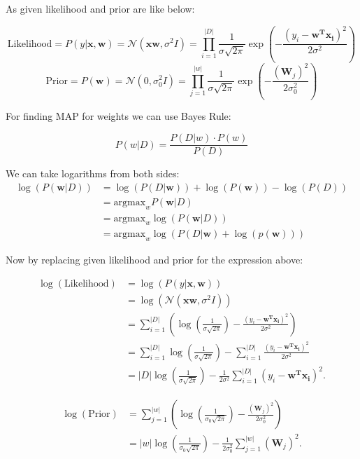 \documentclass{article}
\begin{document}
As given likelihood and prior are like below:

\[
\text{Likelihood} = P(y | \mathbf{x, w}) = \mathcal{N}(\mathbf{xw}, \sigma^2I) = \prod_{i=1}^{|D|} \frac{1}{\sigma \sqrt{2\pi}} \exp\left(- \frac{(y_i - \mathbf{w^T x_i})^2}{2\sigma^2}\right)
\]
\[
\text{Prior} = P(\mathbf{w}) = \mathcal{N}(0, \sigma_0^2I) = \prod_{j=1}^{|w|} \frac{1}{\sigma \sqrt{2\pi}} \exp\left(- \frac{(\mathbf{W}_j)^2}{2\sigma_0^2}\right)
\]

For finding MAP for weights we can use Bayes Rule:

\[
P(w | D) = \frac{P(D | w) \cdot P(w)}{P(D)}
\]

We can take logarithms from both sides:
\begin{align*}
\log(P(\mathbf{w} | D)) &= \log(P(D | \mathbf{w})) + \log(P(\mathbf{w})) - \log(P(D)) \\
&= \text{{argmax}}_w P(\mathbf{w} | D) \\
&= \text{{argmax}}_w \log(P(\mathbf{w} | D)) \\
&= \text{{argmax}}_w \log(P(D | \mathbf{w}) + \log(p(\mathbf{w})))
\end{align*}

Now by replacing given likelihood and prior for the expression above:

\[
\begin{aligned}
\log(\text{Likelihood}) &= \log(P(y | \mathbf{x, w})) \\
&= \log(\mathcal{N}(\mathbf{xw}, \sigma^2I)) \\
&= \sum_{i=1}^{|D|} \left(\log\left(\frac{1}{\sigma \sqrt{2\pi}}\right) - \frac{(y_i - \mathbf{w^T x_i})^2}{2\sigma^2}\right) \\
&= \sum_{i=1}^{|D|} \log\left(\frac{1}{\sigma \sqrt{2\pi}}\right) - \sum_{i=1}^{|D|}\frac{(y_i - \mathbf{w^T x_i})^2}{2\sigma^2} \\
&= |D| \log\left(\frac{1}{\sigma \sqrt{2\pi}}\right) - \frac{1}{2\sigma^2} \sum_{i=1}^{|D|}(y_i - \mathbf{w^T x_i})^2.
\end{aligned}
\]

\bigskip

\[
\begin{aligned}
\log(\text{Prior}) &= \sum_{j=1}^{|w|} \left(\log\left(\frac{1}{\sigma_0 \sqrt{2\pi}}\right) - \frac{(\mathbf{W}_j)^2}{2\sigma_0^2}\right) \\
&= |w| \log\left(\frac{1}{\sigma_0 \sqrt{2\pi}}\right) - \frac{1}{2\sigma_0^2} \sum_{j=1}^{|w|} (\mathbf{W}_j)^2.
\end{aligned}
\]
\end{document}
